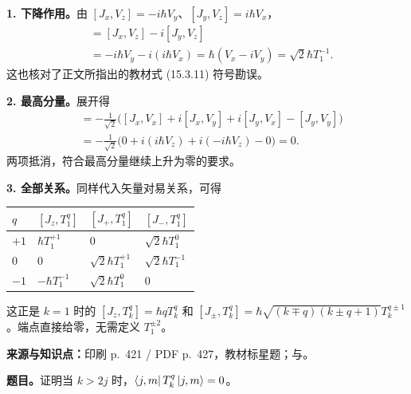\begin{checkedsolution}
\textbf{1. 下降作用。}由 $[J_x,V_z]=-i\hbar V_y$、$[J_y,V_z]=i\hbar V_x$，
\begin{align}
  [J_-,T_1^0]
    &=[J_x,V_z]-i[J_y,V_z]\\
    &=-i\hbar V_y-i(i\hbar V_x)
      =\hbar(V_x-iV_y)
      =\boxed{\sqrt2\hbar T_1^{-1}}.
\end{align}
这也核对了正文所指出的教材式 (15.3.11) 符号勘误。

\textbf{2. 最高分量。}展开得
\begin{align}
  [J_+,T_1^{+1}]
    &=-\frac1{\sqrt2}\bigl([J_x,V_x]+i[J_x,V_y]
           +i[J_y,V_x]-[J_y,V_y]\bigr)\\
    &=-\frac1{\sqrt2}\bigl(0+i(i\hbar V_z)
           +i(-i\hbar V_z)-0\bigr)=\boxed{0}.
\end{align}
两项抵消，符合最高分量继续上升为零的要求。

\textbf{3. 全部关系。}同样代入矢量对易关系，可得
\begin{center}
\renewcommand{\arraystretch}{1.3}
\begin{tabular}{@{}llll@{}}
  \toprule
  $q$ & $[J_z,T_1^q]$ & $[J_+,T_1^q]$ & $[J_-,T_1^q]$ \\
  \midrule
  $+1$ & $\hbar T_1^{+1}$ & $0$ & $\sqrt2\hbar T_1^0$ \\
  $0$ & $0$ & $\sqrt2\hbar T_1^{+1}$ & $\sqrt2\hbar T_1^{-1}$ \\
  $-1$ & $-\hbar T_1^{-1}$ & $\sqrt2\hbar T_1^0$ & $0$ \\
  \bottomrule
\end{tabular}
\end{center}
这正是 $k=1$ 时的 $[J_z,T_k^q]=\hbar qT_k^q$ 和 $[J_\pm,T_k^q]=\hbar\sqrt{(k\mp q)(k\pm q+1)}T_k^{q\pm1}$。端点直接给零，无需定义 $T_1^{\pm2}$。
\end{checkedsolution}

\textbf{来源与知识点：}印刷 p.~421 / PDF p.~427，教材标星题；与。

\textbf{题目。}证明当 $k>2j$ 时，$\left\langle j,m\right|T_k^q\left|j,m\right\rangle=0$。


